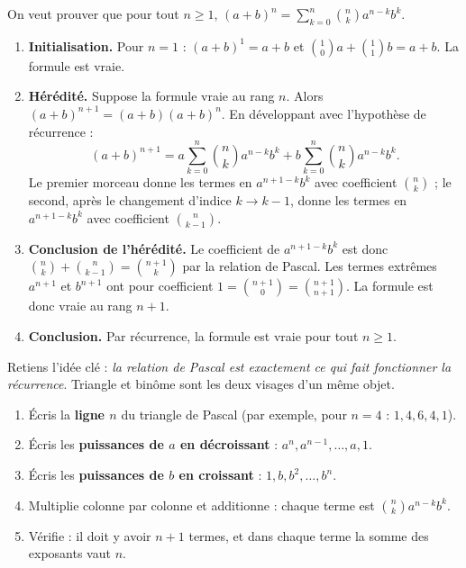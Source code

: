 \documentclass[11pt]{article}
\begin{document}
\begin{experience}
On veut prouver que pour tout $n \geq 1$, $(a+b)^n = \sum_{k=0}^{n}\binom{n}{k}a^{n-k}b^k$.
\begin{enumerate}
\item \textbf{Initialisation.} Pour $n=1$ : $(a+b)^1 = a+b$ et $\binom{1}{0}a + \binom{1}{1}b = a+b$. La formule est vraie.
\item \textbf{Hérédité.} Suppose la formule vraie au rang $n$. Alors $(a+b)^{n+1} = (a+b)(a+b)^n$. En développant avec l'hypothèse de récurrence :
\[ (a+b)^{n+1} = a\sum_{k=0}^{n}\binom{n}{k}a^{n-k}b^k + b\sum_{k=0}^{n}\binom{n}{k}a^{n-k}b^k. \]
Le premier morceau donne les termes en $a^{n+1-k}b^k$ avec coefficient $\binom{n}{k}$ ; le second, après le changement d'indice $k \to k-1$, donne les termes en $a^{n+1-k}b^k$ avec coefficient $\binom{n}{k-1}$.
\item \textbf{Conclusion de l'hérédité.} Le coefficient de $a^{n+1-k}b^k$ est donc $\binom{n}{k} + \binom{n}{k-1} = \binom{n+1}{k}$ par la relation de Pascal. Les termes extrêmes $a^{n+1}$ et $b^{n+1}$ ont pour coefficient $1 = \binom{n+1}{0} = \binom{n+1}{n+1}$. La formule est donc vraie au rang $n+1$.
\item \textbf{Conclusion.} Par récurrence, la formule est vraie pour tout $n \geq 1$.
\end{enumerate}
Retiens l'idée clé : \emph{la relation de Pascal est exactement ce qui fait fonctionner la récurrence}. Triangle et binôme sont les deux visages d'un même objet.
\end{experience}

\begin{methode}
\begin{enumerate}
\item Écris la \textbf{ligne $n$} du triangle de Pascal (par exemple, pour $n=4$ : $1, 4, 6, 4, 1$).
\item Écris les \textbf{puissances de $a$ en décroissant} : $a^n, a^{n-1}, \ldots, a, 1$.
\item Écris les \textbf{puissances de $b$ en croissant} : $1, b, b^2, \ldots, b^n$.
\item Multiplie colonne par colonne et additionne : chaque terme est $\binom{n}{k} a^{n-k} b^k$.
\item Vérifie : il doit y avoir $n+1$ termes, et dans chaque terme la somme des exposants vaut $n$.
\end{enumerate}
\end{methode}
\end{document}
